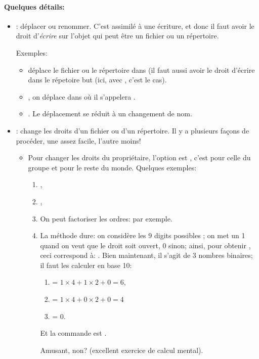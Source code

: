 \paragraph{Quelques détails:}
\begin{itemize}
\item {}: déplacer ou renommer. C'est assimilé à une écriture,
  et donc il faut avoir le droit d'\emph{écrire} sur l'objet qui peut
  être un fichier ou un répertoire.

  Exemples:
  \begin{itemize}
    \item {} déplace le fichier ou le répertoire
       dans  (il faut aussi avoir le droit
      d'écrire dans le répetoire but (ici, avec , c'est le cas).
    \item {}, on déplace  dans
       où il s'appelera .
    \item {}. Le déplacement se réduit à un
      changement de nom.
  \end{itemize}
\item {}: change les droits d'un fichier ou d'un
  répertoire. Il y a plusieurs façons de procéder, une assez facile,
  l'autre moins!
  \begin{itemize}
    \item Pour changer les droits du propriétaire, l'option est
      , c'est  pour celle du groupe et  pour
      le reste du monde. Quelques exemples:
      \begin{enumerate}
      \item {},
      \item {},
      \item On peut \og factoriser\fg{} les ordres:
         par exemple.
      \item La méthode \og dure\fg{}: on considère les 9 digits
        possibles ; on met un 1 quand on veut que le
        droit soit ouvert, 0 sinon; ainsi, pour obtenir
        , ceci correspond à: . Bien
        maintenant, il s'agit de 3  nombres binaires; il faut les calculer
        en base 10:
        \begin{enumerate}
        \item {}= $1\times 4 + 1 \times 2 +0 =6$,
        \item {}= $1\times 4 + 0 \times 2 +0 = 4$
        \item {}= $0$.
        \end{enumerate}
        
        Et la commande est .

        Amusant, non?
        (excellent exercice de calcul mental).
      \end{enumerate}
  \end{itemize}
\end{itemize}
